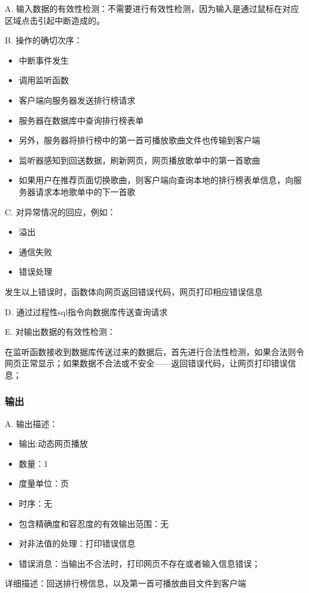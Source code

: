    
   
   A. 输入数据的有效性检测：不需要进行有效性检测，因为输入是通过鼠标在对应区域点击引起中断造成的。
   
   B. 操作的确切次序：
   \begin{adjustwidth}{2cm}{1cm}\qquad
	   \begin{itemize}
		\item 中断事件发生
		\item 调用监听函数
		\item 客户端向服务器发送排行榜请求
		\item 服务器在数据库中查询排行榜表单
		\item 另外，服务器将排行榜中的第一首可播放歌曲文件也传输到客户端
		\item 监听器感知到回送数据，刷新网页，网页播放歌单中的第一首歌曲
		\item 如果用户在推荐页面切换歌曲，则客户端向查询本地的排行榜表单信息，向服务器请求本地歌单中的下一首歌
	   \end{itemize}		
   \end{adjustwidth}
	
   
   C. 对异常情况的回应，例如：
   \begin{adjustwidth}{2cm}{1cm}\qquad
	   \begin{itemize}
		   \item 溢出
		   \item 通信失败
		   \item 错误处理
	   \end{itemize}		
   \end{adjustwidth}
   
	   发生以上错误时，函数体向网页返回错误代码，网页打印相应错误信息
   
D. 通过过程性sql指令向数据库传送查询请求
		   
   E. 对输出数据的有效性检测：
   
   在监听函数接收到数据库传送过来的数据后，首先进行合法性检测，如果合法则令网页正常显示；如果数据不合法或不安全——返回错误代码，让网页打印错误信息；
   
   \subsubsection{输出}
   
   A. 输出描述：
   \begin{itemize}
	\item	输出:动态网页播放
	\item	数量：1
	\item	度量单位：页
	\item	时序：无
	\item	包含精确度和容忍度的有效输出范围：无
	\item	对非法值的处理：打印错误信息
	\item	错误消息：当输出不合法时，打印网页不存在或者输入信息错误；
   \end{itemize}
   详细描述：回送排行榜信息，以及第一首可播放曲目文件到客户端







